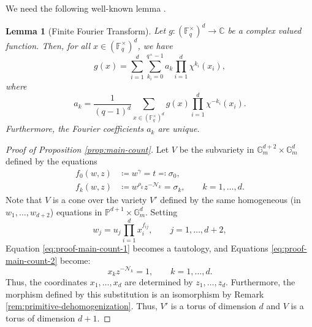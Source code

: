 \documentclass[11pt, reqno]{amsart}
\theoremstyle{plain}
\newtheorem{lem}[theo]{Lemma}
\theoremstyle{definition}
\newcommand{\Ps}{\mathbb{P}}
\newcommand{\F}{\mathbb{F}}
\newcommand{\G}{\mathbb{G}}
\begin{document}
We need the following well-known lemma \cite[Chapter VI, Section 1.2]{serre}.
\begin{lem}[Finite Fourier Transform]\label{lem:fourier-series}
Let $g: \left(\F_{q}^{\times}\right)^{d} \to \mathbb{C}$ be a complex valued function. Then, for all $x \in \left(\F_{q}^{\times}\right)^{d}$, we have
\[
g(x) = \sum_{i=1}^d \sum_{k_i =0}^{q^\times -1} a_k \prod_{i=1}^d \chi^{k_i}(x_i),
\]
where 
\[
a_k = \frac{1}{(q-1)^{d}}\sum_{x \in (\F_q^{\times})^{d} } g(x) \prod_{i=1}^d\chi^{-k_i}(x_i).
\]
Furthermore, the \emph{Fourier coefficients} $a_k$ are unique. 
\end{lem}

\begin{proof}[Proof of Proposition \ref{prop:main-count}]
Let $V$ be the subvariety in $\G_m^{d+2} \times \G_m^d$ defined by the equations
\begin{align}
f_0(w,z)&\coloneqq w^{\gamma} =t\eqqcolon \sigma_0, \label{eq:proof-main-count-1}\\
f_k(w,z)&\coloneqq w^{\rho_k} z^{-\mathcal{N}_k}=  \sigma_k, \qquad k=1,\dots,d.\label{eq:proof-main-count-2}
\end{align}
Note that $V$ is a cone over the variety $V'$ defined by the same homogeneous (in $w_1, \dots, w_{d+2}$) equations in $\Ps^{d+1} \times \G_m^d$. Setting 
\[
w_j = u_j \prod_{i=1}^{d} x_i^{f_{ij}}, \qquad j=1,\dots,d+2,
\]
Equation \eqref{eq:proof-main-count-1} becomes a tautology, and Equations \eqref{eq:proof-main-count-2} become:
\[
x_k z^{-\mathcal{N}_k}=  1, \qquad k=1,\dots,d.
\]
Thus, the coordinates $x_1,\dots,x_d$ are determined by $z_1,\dots,z_d$. Furthermore, the morphism defined by this substitution is an isomorphism by Remark \ref{rem:primitive-dehomogenization}. 
Thus, $V'$ is a torus of dimension $d$ and $V$ is a torus of dimension $d+1$.


\end{proof}
\end{document}
